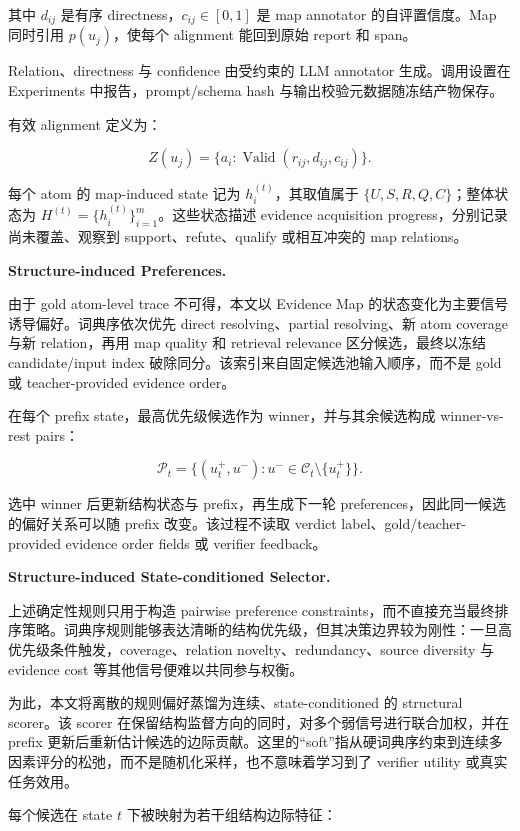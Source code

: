 \documentclass[letterpaper]{article}
\begin{document}
其中 $d_{ij}$ 是有序 directness，$c_{ij}\in[0,1]$ 是 map annotator 的自评置信度。Map 同时引用 $p(u_j)$，使每个 alignment 能回到原始 report 和 span。

Relation、directness 与 confidence 由受约束的 LLM annotator 生成。调用设置在 Experiments 中报告，prompt/schema hash 与输出校验元数据随冻结产物保存。

有效 alignment 定义为：

\[
Z(u_j)=\{a_i:\operatorname{Valid}(r_{ij},d_{ij},c_{ij})\}.
\]

每个 atom 的 map-induced state 记为 $h_i^{(t)}$，其取值属于 $\{U,S,R,Q,C\}$；整体状态为 $H^{(t)}=\{h_i^{(t)}\}_{i=1}^{m}$。这些状态描述 evidence acquisition progress，分别记录尚未覆盖、观察到 support、refute、qualify 或相互冲突的 map relations。

\textbf{Structure-induced Preferences.}

由于 gold atom-level trace 不可得，本文以 Evidence Map 的状态变化为主要信号诱导偏好。词典序依次优先 direct resolving、partial resolving、新 atom coverage 与新 relation，再用 map quality 和 retrieval relevance 区分候选，最终以冻结 candidate/input index 破除同分。该索引来自固定候选池输入顺序，而不是 gold 或 teacher-provided evidence order。

在每个 prefix state，最高优先级候选作为 winner，并与其余候选构成 winner-vs-rest pairs：

\[
\mathcal P_t=\{(u_t^+,u^-):u^-\in\mathcal C_t\setminus\{u_t^+\}\}.
\]

选中 winner 后更新结构状态与 prefix，再生成下一轮 preferences，因此同一候选的偏好关系可以随 prefix 改变。该过程不读取 verdict label、gold/teacher-provided evidence order fields 或 verifier feedback。

\textbf{Structure-induced State-conditioned Selector.}

上述确定性规则只用于构造 pairwise preference constraints，而不直接充当最终排序策略。词典序规则能够表达清晰的结构优先级，但其决策边界较为刚性：一旦高优先级条件触发，coverage、relation novelty、redundancy、source diversity 与 evidence cost 等其他信号便难以共同参与权衡。

为此，本文将离散的规则偏好蒸馏为连续、state-conditioned 的 structural scorer。该 scorer 在保留结构监督方向的同时，对多个弱信号进行联合加权，并在 prefix 更新后重新估计候选的边际贡献。这里的“soft”指从硬词典序约束到连续多因素评分的松弛，而不是随机化采样，也不意味着学习到了 verifier utility 或真实任务效用。

每个候选在 state $t$ 下被映射为若干组结构边际特征：
\end{document}

